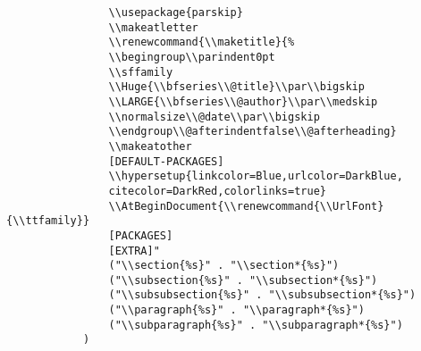 \documentclass[11pt]{article}
\begin{document}
\begin{verbatim}
                \\usepackage{parskip}
                \\makeatletter
                \\renewcommand{\\maketitle}{%
                \\begingroup\\parindent0pt
                \\sffamily
                \\Huge{\\bfseries\\@title}\\par\\bigskip
                \\LARGE{\\bfseries\\@author}\\par\\medskip
                \\normalsize\\@date\\par\\bigskip
                \\endgroup\\@afterindentfalse\\@afterheading}
                \\makeatother
                [DEFAULT-PACKAGES]
                \\hypersetup{linkcolor=Blue,urlcolor=DarkBlue,
                citecolor=DarkRed,colorlinks=true}
                \\AtBeginDocument{\\renewcommand{\\UrlFont}{\\ttfamily}}
                [PACKAGES]
                [EXTRA]"
                ("\\section{%s}" . "\\section*{%s}")
                ("\\subsection{%s}" . "\\subsection*{%s}")
                ("\\subsubsection{%s}" . "\\subsubsection*{%s}")
                ("\\paragraph{%s}" . "\\paragraph*{%s}")
                ("\\subparagraph{%s}" . "\\subparagraph*{%s}")
            )


\end{verbatim}
\end{document}
